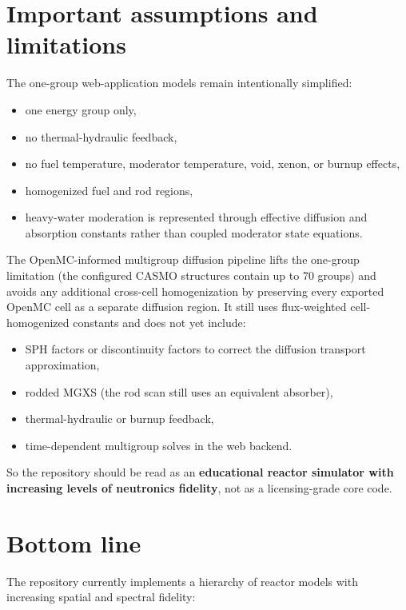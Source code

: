 \documentclass[11pt]{article}
\begin{document}
\section{Important assumptions and limitations}

The one-group web-application models remain intentionally simplified:
\begin{itemize}
  \item one energy group only,
  \item no thermal-hydraulic feedback,
  \item no fuel temperature, moderator temperature, void, xenon, or burnup effects,
  \item homogenized fuel and rod regions,
  \item heavy-water moderation is represented through effective diffusion and
        absorption constants rather than coupled moderator state equations.
\end{itemize}

The OpenMC-informed multigroup diffusion pipeline lifts the one-group
limitation (the configured CASMO structures contain up to 70 groups) and
avoids any additional cross-cell homogenization by preserving every exported
OpenMC cell as a separate diffusion region.  It still uses flux-weighted
cell-homogenized constants and does not yet include:
\begin{itemize}
  \item SPH factors or discontinuity factors to correct the diffusion
        transport approximation,
  \item rodded MGXS (the rod scan still uses an equivalent absorber),
  \item thermal-hydraulic or burnup feedback,
  \item time-dependent multigroup solves in the web backend.
\end{itemize}

So the repository should be read as an \textbf{educational reactor simulator with
increasing levels of neutronics fidelity}, not as a licensing-grade core code.

\section{Bottom line}

The repository currently implements a hierarchy of reactor models with
increasing spatial and spectral fidelity:
\end{document}
